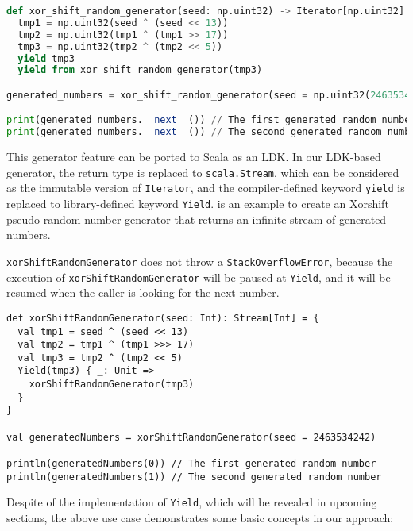 \begin{lstlisting}[language=Python,style=Python3,caption={An Xorshift pseudo-random number generator in Python 3.5+},label={xorShiftRandomGenerator-Python}]
def xor_shift_random_generator(seed: np.uint32) -> Iterator[np.uint32]:
  tmp1 = np.uint32(seed ^ (seed << 13))
  tmp2 = np.uint32(tmp1 ^ (tmp1 >> 17))
  tmp3 = np.uint32(tmp2 ^ (tmp2 << 5))
  yield tmp3
  yield from xor_shift_random_generator(tmp3)

generated_numbers = xor_shift_random_generator(seed = np.uint32(2463534242))

print(generated_numbers.__next__()) // The first generated random number
print(generated_numbers.__next__()) // The second generated random number
\end{lstlisting}

This generator feature can be ported to Scala as an LDK. In our LDK-based generator, the return type is replaced to \lstinline{scala.Stream}, which can be considered as the immutable version of \lstinline{Iterator}, and the compiler-defined keyword \lstinline{yield} is replaced to library-defined keyword \lstinline{Yield}.  is an example to create an Xorshift \cite{marsaglia2003xorshift} pseudo-random number generator that returns an infinite stream of generated numbers. 

\lstinline{xorShiftRandomGenerator} does not throw a \lstinline{StackOverflowError}, because the execution of \lstinline{xorShiftRandomGenerator} will be paused at \lstinline{Yield}, and it will be resumed when the caller is looking for the next number.

\begin{lstlisting}[caption={An Xorshift pseudo-random number generator with the help of the LDK \lstinline{Yield}},label={xorShiftRandomGenerator}]
def xorShiftRandomGenerator(seed: Int): Stream[Int] = {
  val tmp1 = seed ^ (seed << 13)
  val tmp2 = tmp1 ^ (tmp1 >>> 17)
  val tmp3 = tmp2 ^ (tmp2 << 5)
  Yield(tmp3) { _: Unit =>
    xorShiftRandomGenerator(tmp3)
  }
}

val generatedNumbers = xorShiftRandomGenerator(seed = 2463534242)

println(generatedNumbers(0)) // The first generated random number
println(generatedNumbers(1)) // The second generated random number
\end{lstlisting}

Despite of the implementation of \lstinline{Yield}, which will be revealed in upcoming sections, the above use case demonstrates some basic concepts in our approach:

